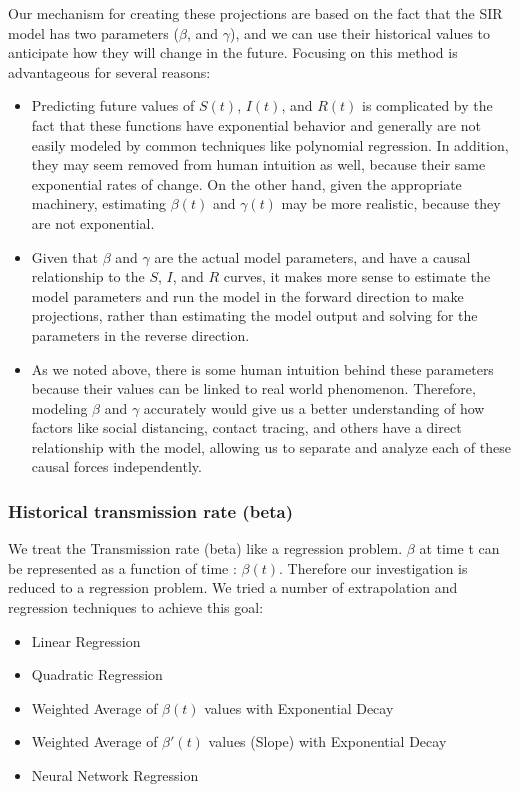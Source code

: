 \documentclass[11pt]{article}
\begin{document}
Our mechanism for creating these projections are based on the fact that the SIR model has two parameters ($\beta$, and $\gamma$), and we can use their historical values to anticipate how they will change in the future. Focusing on this method is advantageous for several reasons:
\begin{itemize}
    \item Predicting future values of $S(t)$, $I(t)$, and $R(t)$ is complicated by the fact that these functions have exponential behavior and generally are not easily modeled by common techniques like polynomial regression. In addition, they may seem removed from human intuition as well, because their same exponential rates of change. On the other hand, given the appropriate machinery, estimating $\beta(t)$ and $\gamma(t)$ may be more realistic, because they are not exponential.
    \item Given that $\beta$ and $\gamma$ are the actual model parameters, and have a causal relationship to the $S$, $I$, and $R$ curves, it makes more sense to estimate the model parameters and run the model in the forward direction to make projections, rather than estimating the model output and solving for the parameters in the reverse direction.
    \item As we noted above, there is some human intuition behind these parameters because their values can be linked to real world phenomenon. Therefore, modeling $\beta$ and $\gamma$ accurately would give us a better understanding of how factors like social distancing, contact tracing, and others have a direct relationship with the model, allowing us to separate and analyze each of these causal forces independently.
\end{itemize}

\subsubsection{Historical transmission rate (beta)}
We treat the Transmission rate (beta) like a regression problem. $\beta$ at time t can be represented as a function of time : $\beta(t)$. Therefore our investigation is reduced to a regression problem.  We tried a number of extrapolation and regression techniques to achieve this goal:
\begin{itemize}
    \item Linear Regression
    \item Quadratic Regression
    \item Weighted Average of $\beta(t)$ values with Exponential Decay
    \item Weighted Average of $\beta'(t)$ values (Slope) with Exponential Decay
    \item Neural Network Regression
\end{itemize}
\end{document}
